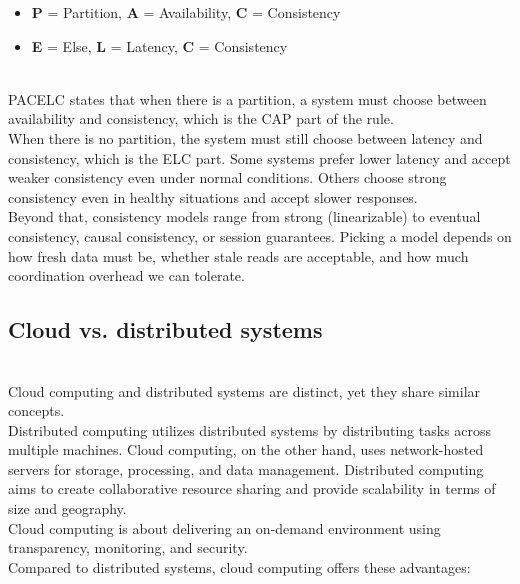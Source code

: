 \begin{itemize}
\item
\protect{}\label{ijGiPkTcTlsAKM8R3JMh6}
\textbf{P} = Partition, \textbf{A} = Availability, \textbf{C} = Consistency
\item
\protect{}\label{MmT6cdLWfGPbi8VspUS37}
\textbf{E} = Else, \textbf{L} = Latency, \textbf{C} = Consistency
\end{itemize}
\\
PACELC states that when there is a partition, a system must choose between availability and consistency, which is the CAP part of the rule.
\\
When there is no partition, the system must still choose between latency and consistency, which is the ELC part. Some systems prefer lower latency and accept weaker consistency even under normal conditions. Others choose strong consistency even in healthy situations and accept slower responses.
\\
Beyond that, consistency models range from strong (linearizable) to eventual consistency, causal consistency, or session guarantees. Picking a model depends on how fresh data must be, whether stale reads are acceptable, and how much coordination overhead we can tolerate.

\subsection{Cloud vs. distributed systems}\label{pncZTnZW37XBR4X9yfnS4}
\\
Cloud computing and distributed systems are distinct, yet they share similar concepts.
\\
Distributed computing utilizes distributed systems by distributing tasks across multiple machines. Cloud computing, on the other hand, uses network-hosted servers for storage, processing, and data management. Distributed computing aims to create collaborative resource sharing and provide scalability in terms of size and geography.
\\
Cloud computing is about delivering an on-demand environment using transparency, monitoring, and security.
\\
Compared to distributed systems, cloud computing offers these advantages:

